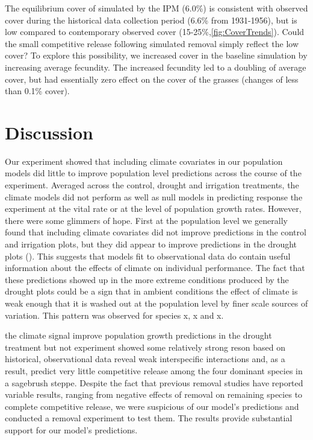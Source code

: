 \documentclass[11pt]{article}
\begin{document}
\begin{doublespacing}
The equilibrium cover of  simulated by the IPM (6.0\%) is consistent with observed cover during the historical data collection period (6.6\% from 1931-1956), but is low compared to contemporary observed cover (15-25\%,\ref{fig:CoverTrends}). Could the small competitive release following simulated  removal simply reflect the low  cover? To explore this possibility, we increased  cover in the baseline simulation by increasing average  fecundity. The increased fecundity led to a doubling of  average cover, but had essentially zero effect on the cover of the grasses (changes of less than 0.1\% cover). 

\section*{Discussion}

Our experiment showed that including climate covariates in our population models did little to improve population level predictions across the course of the experiment.  Averaged across the control, drought and irrigation treatments, the climate models did not perform as well as null models in predicting response the experiment at the vital rate or at the level of population growth rates.  However, there were some glimmers of hope.  First at the population level we generally found that including climate covariates did not improve predictions in the control and irrigation plots, but they did appear to improve predictions in the drought plots ().  This suggests that models fit to observational data do contain useful information about the effects of climate on individual performance.  The fact that these predictions showed up in the more extreme conditions produced by the drought plots could be a sign that in ambient conditions the effect of climate is weak enough that it is washed out at the population level by finer scale sources of variation. This pattern was observed for species x, x and x.

 the climate signal  improve population growth predictions in the drought treatment but not experiment showed some relatively strong reson based on historical, observational data reveal weak interspecific interactions \citep{adler_coexistence_2010,chu_large_2015} and, as a result, predict very little competitive release among the four dominant species in a sagebrush steppe. Despite the fact that previous removal studies have reported variable results, ranging from negative effects of removal on remaining species to complete competitive release, we were suspicious of our model's predictions and conducted a removal experiment to test them. The results provide substantial support for our model's predictions.


\end{doublespacing}
\end{document}
